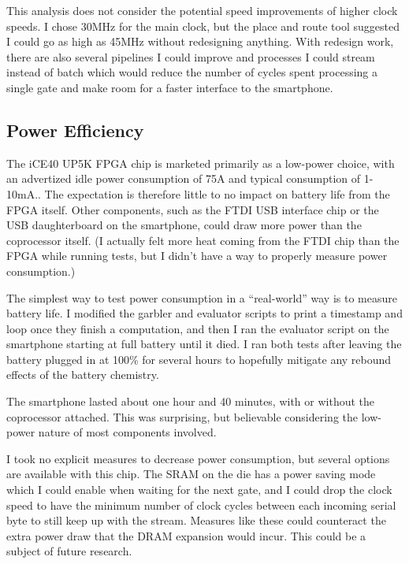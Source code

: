 This analysis does not consider the potential speed improvements of higher clock speeds. I chose 30MHz for the main clock, but the place and route tool suggested I could go as high as 45MHz without redesigning anything. With redesign work, there are also several pipelines I could improve and processes I could stream instead of batch which would reduce the number of cycles spent processing a single gate and make room for a faster interface to the smartphone.



\subsection{Power Efficiency}
The iCE40 UP5K FPGA chip is marketed primarily as a low-power choice, with an advertized idle power consumption of 75\textmu{}A and typical consumption of 1-10mA.\cite{LatticePage}. The expectation is therefore little to no impact on battery life from the FPGA itself. Other components, such as the FTDI USB interface chip or the USB daughterboard on the smartphone, could draw more power than the coprocessor itself. (I actually felt more heat coming from the FTDI chip than the FPGA while running tests, but I didn't have a way to properly measure power consumption.)

The simplest way to test power consumption in a ``real-world'' way is to measure battery life. I modified the garbler and evaluator scripts to print a timestamp and loop once they finish a computation, and then I ran the evaluator script on the smartphone starting at full battery until it died. I ran both tests after leaving the battery plugged in at 100\% for several hours to hopefully mitigate any rebound effects of the battery chemistry.

The smartphone lasted about one hour and 40 minutes, with or without the coprocessor attached. This was surprising, but believable considering the low-power nature of most components involved.

I took no explicit measures to decrease power consumption, but several options are available with this chip. The SRAM on the die has a power saving mode which I could enable when waiting for the next gate, and I could drop the clock speed to have the minimum number of clock cycles between each incoming serial byte to still keep up with the stream. Measures like these could counteract the extra power draw that the DRAM expansion would incur. This could be a subject of future research.
